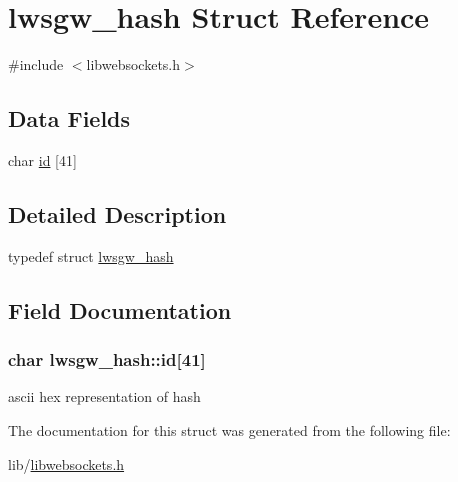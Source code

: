 \hypertarget{structlwsgw__hash}{}\section{lwsgw\+\_\+hash Struct Reference}
\label{structlwsgw__hash}


{\ttfamily \#include $<$libwebsockets.\+h$>$}

\subsection*{Data Fields}
\begin{DoxyCompactItemize}
\item 
char \hyperlink{structlwsgw__hash_a29435f5cf78747d4257695b0f141d164}{id} \mbox{[}41\mbox{]}
\end{DoxyCompactItemize}


\subsection{Detailed Description}
typedef struct \hyperlink{structlwsgw__hash}{lwsgw\+\_\+hash} 

\subsection{Field Documentation}
\subsubsection[{\texorpdfstring{id}{id}}]{\setlength{\rightskip}{0pt plus 5cm}char lwsgw\+\_\+hash\+::id\mbox{[}41\mbox{]}}\hypertarget{structlwsgw__hash_a29435f5cf78747d4257695b0f141d164}{}\label{structlwsgw__hash_a29435f5cf78747d4257695b0f141d164}
ascii hex representation of hash 

The documentation for this struct was generated from the following file\+:\begin{DoxyCompactItemize}
\item 
lib/\hyperlink{libwebsockets_8h}{libwebsockets.\+h}\end{DoxyCompactItemize}
